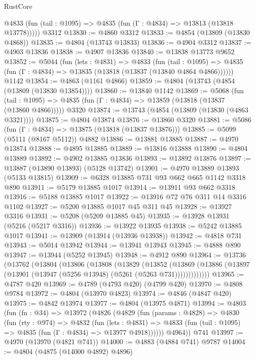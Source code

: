 \begin{lexlean}{RustCore}
\begin{coremodule}
      @4833 (fun (tail : @1095) => @4835 (fun (Γ : @4834) => @13813 (@13818 @13778)))))
    @3312
@13830 := @4860 @3312
@13833 := @4854 (@13809 (@13830 @4868))
@13835 := @4804 (@13743 @13833)
@13836 := @4904 @3312
@13837 := @4903 @13836
@13838 := @4907 @13836
@13840 := @13838 @13773 @9652
@13852 := @5044
    (fun (lets : @4831) =>
    @4833
      (fun (tail : @1095) =>
      @4835 (fun (Γ : @4834) => @13835 (@13818 (@13837 (@13840 @4864 @4866))))))
    @1142
@13854 := @4863 (@1161 @4866)
@13859 := @4804 (@13743 (@4854 (@13809 (@13830 @13854))))
@13860 := @13840 @1142
@13869 := @5068
    (fun (tail : @1095) => @4835 (fun (Γ : @4834) => @13859 (@13818 (@13837 (@13860 @4866)))))
    @3320
@13874 := @13743 (@4854 (@13809 (@13830 (@4863 @3321))))
@13875 := @4804 @13874
@13876 := @13860 @3320
@13881 := @5086 (fun (Γ : @4834) => @13875 (@13818 (@13837 @13876)))
@13885 := @5099 (@5111 (@8167 @5112)) @4882
@13886 := @13881 @13885
@13887 := @4970 @13874
@13888 := @4895 @13885
@13889 := @13816 @13888
@13890 := @4804 @13889
@13892 := @4902 @13885 @13836
@13893 := @13892 @13876
@13897 := @13887 (@13890 @13893) (@5128 @13742)
@13901 := @4970 @13889 @13893 (@5133 @13815)
@13909 := @6328 @13885 @731 @93 @662 @665 @1142 @3318 @890
@13911 := @5179 @13885 @1017
@13914 := @13911 @93 @662 @3318
@13916 := @5188 @13885 @1017
@13922 := @13916 @72 @76 @311 @14 @3316 @1102
@13927 := @5200 @13885 @1017 @45 @311 @45
@13928 := @13927 @3316
@13931 := @5208 (@5209 @13885 @45)
@13935 := @13928 @13931 (@5216 (@5217 @3316))
@13936 := @13922 @13935
@13938 := @5242 @13885 @1017
@13941 := @13909 (@13914 (@13936 @13938))
@13942 := @4818 @731
@13943 := @5014 @13942
@13944 := @13941 @13943
@13945 := @4888 @890
@13947 := @13944 (@5252 @13945)
@13948 := @4912 @890
@13964 := @13736
    (@13762
      (@13804
        (@13806
          (@13808
            (@13829
              (@13852
                (@13869
                  (@13886 (@13897 (@13901 (@13947 (@5256 @13948) (@5261 (@5263 @731)))))))))))))
@13965 := @4787 @420
@13969 := @4789 (@4793 @420) (@4799 @420)
@13970 := @4808 @9784
@13972 := @4804 (@13970 @4823)
@13974 := @4846 (@4847 @420)
@13975 := @4842 @13974
@13977 := @4804 (@13975 @4871)
@13994 := @4803
    (fun (fn : @34) =>
    @13972
      (@4826
        (@4829
          (fun (params : @4828) =>
          @4830
            (fun (rty : @974) =>
            @4832
              (fun (lets : @4831) =>
              @4833 (fun (tail : @1095) => @4835 (fun (Γ : @4834) => @13977 @4918))))))
        @4964))
    @741
@13997 := @4970 (@13970 (@4821 @741))
@14000 := @4883 (@4884 @741) @9787
@14004 := @4804 (@4875 (@14000 @4892) @4896)

\end{coremodule}
\end{lexlean}
